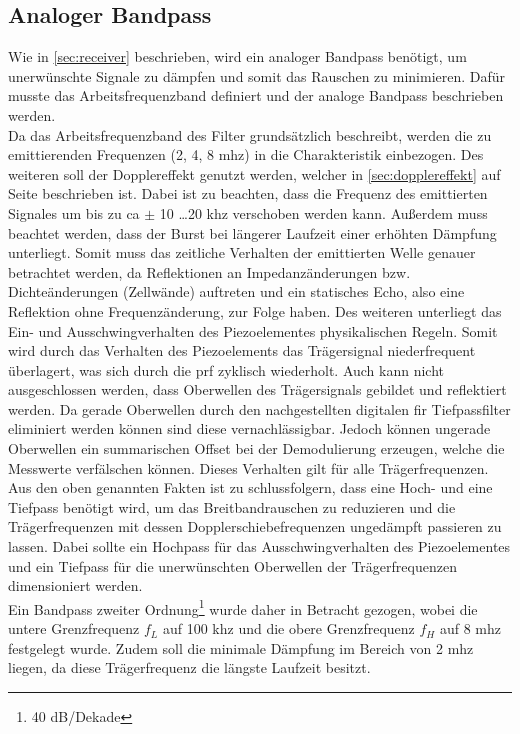 \subsection{Analoger Bandpass}
Wie in \autoref{sec:receiver} beschrieben, wird ein analoger Bandpass benötigt, um unerwünschte Signale zu dämpfen und somit das Rauschen zu minimieren. Dafür musste das Arbeitsfrequenzband definiert und der analoge Bandpass beschrieben werden.\\
Da das Arbeitsfrequenzband des Filter grundsätzlich beschreibt, werden die zu emittierenden Frequenzen (2, 4, 8 \ac{mhz}) in die Charakteristik einbezogen. Des weiteren soll der Dopplereffekt genutzt werden, welcher in \autoref{sec:dopplereffekt} auf Seite \pageref{sec:dopplereffekt} beschrieben ist. Dabei ist zu beachten, dass die Frequenz des emittierten Signales um bis zu \ac{ca} $\pm$ 10 \ldots 20 \ac{khz} verschoben werden kann. Außerdem muss beachtet werden, dass der Burst bei längerer Laufzeit einer erhöhten Dämpfung unterliegt. Somit muss das zeitliche Verhalten der emittierten Welle genauer betrachtet werden, da Reflektionen an Impedanzänderungen bzw. Dichteänderungen (Zellwände) auftreten und ein statisches Echo, also eine Reflektion ohne Frequenzänderung, zur Folge haben. Des weiteren unterliegt das Ein- und Ausschwingverhalten des Piezoelementes physikalischen Regeln. Somit wird durch das Verhalten des Piezoelements das Trägersignal niederfrequent überlagert, was sich durch die \ac{prf} zyklisch wiederholt. Auch kann nicht ausgeschlossen werden, dass Oberwellen des Trägersignals gebildet und reflektiert werden. Da gerade Oberwellen durch den nachgestellten digitalen \ac{fir} Tiefpassfilter eliminiert werden können sind diese vernachlässigbar. Jedoch können ungerade Oberwellen ein summarischen Offset bei der Demodulierung erzeugen, welche die Messwerte verfälschen können. Dieses Verhalten gilt für alle Trägerfrequenzen.\\
Aus den oben genannten Fakten ist zu schlussfolgern, dass eine Hoch- und eine Tiefpass benötigt wird, um das Breitbandrauschen zu reduzieren und die Trägerfrequenzen mit dessen Dopplerschiebefrequenzen ungedämpft passieren zu lassen. Dabei sollte ein Hochpass für das Ausschwingverhalten des Piezoelementes und ein Tiefpass für die unerwünschten Oberwellen der Trägerfrequenzen dimensioniert werden.\\
Ein Bandpass zweiter Ordnung\footnote{40 dB/Dekade} wurde daher in Betracht gezogen, wobei die untere Grenzfrequenz $f_L$ auf 100 \ac{khz} und die obere Grenzfrequenz $f_H$ auf 8 \ac{mhz} festgelegt wurde. Zudem soll die minimale Dämpfung im Bereich von 2 \ac{mhz} liegen, da diese Trägerfrequenz die längste Laufzeit besitzt.
